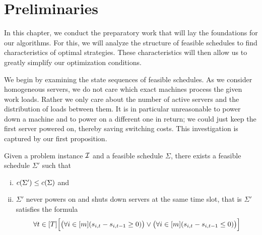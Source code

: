 
\chapter{Preliminaries}\label{chap:preliminaries}
In this chapter, we conduct the preparatory work that will lay the foundations for our algorithms. For this, we will analyze the structure of feasible schedules to find characteristics of optimal strategies. These characteristics will then allow us to greatly simplify our optimization conditions.

We begin by examining the state sequences of feasible schedules. As we consider homogeneous servers, we do not care which exact machines process the given work loads. Rather we only care about the number of active servers and the distribution of loads between them. It is in particular unreasonable to power down a machine and to power on a different one in return; we could just keep the first server powered on, thereby saving switching costs.
This investigation is captured by our first proposition.
\begin{prop}\label{prop:reasonable_switching}
Given a problem instance $\mathcal{I}$ and a feasible schedule $\Sigma$, there exists a feasible schedule $\Sigma'$ such that 
\begin{enumerate}[(i)]
		\item $c(\Sigma')\le c(\Sigma)$ and 
		\item $\Sigma'$ never powers on and shuts down servers at the same time slot, that is $\Sigma'$ satisfies the formula
\begin{equation}
	\forall t\in[T]\Bigl[\bigl(\forall i\in[m](s_{i,t}-s_{i,t-1}\ge0)\bigr)\lor\bigl(\forall i\in[m](s_{i,t}-s_{i,t-1}\le 0)\bigr)\Bigr]\label{eq:reasonable_switching}
\end{equation}
\end{enumerate}
\end{prop}
